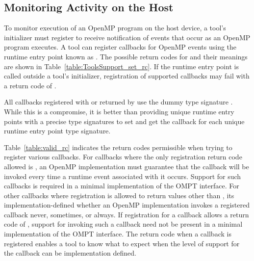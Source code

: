 \subsection{Monitoring Activity on the Host}
\label{sec:ompt-register-callbacks}

To monitor execution of an OpenMP program on the host device, a tool's
initializer must register to receive notification
of events that occur as an OpenMP program executes.  
A tool can register callbacks for OpenMP events using
the runtime entry point known as 
.  The possible return codes for
 and their meanings are shown in
Table~\ref{table:ToolsSupport_set_rc}.  
If the  runtime entry point is
called outside a tool's initializer, registration of supported
callbacks may fail with a return code of . 

All callbacks registered with  or returned
by  use the dummy type signature
.  While this is a compromise, it is better
than providing unique runtime entry points with a precise type signatures to
set and get the callback for each unique runtime entry point type signature.

Table~\ref{table:valid_rc} indicates the return codes permissible
when trying to register various callbacks. For callbacks where the only registration return code
allowed is , an
OpenMP implementation must guarantee that the callback will be
invoked every time a runtime event associated with it occurs. Support
for such callbacks is required in a minimal implementation of the
OMPT interface. For other callbacks where registration is allowed to return values
other than , its implementation-defined
whether an OpenMP implementation invokes a registered callback
never, sometimes, or always. If registration for a callback allows 
a return code of , support for invoking such 
a callback need not be present in a minimal implementation of the 
OMPT interface.  The return code when a callback is
registered enables a tool to know what to expect when the level
of support for the callback can be implementation defined.



